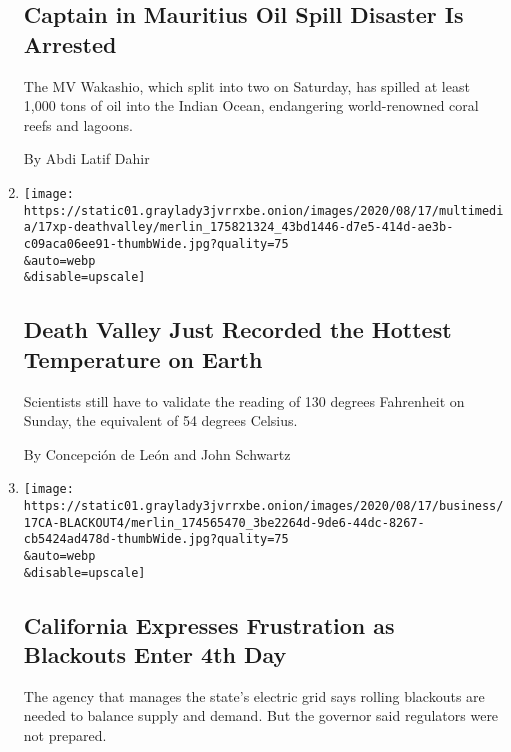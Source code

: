 \begin{enumerate}
  \hypertarget{captain-in-mauritius-oil-spill-disaster-is-arrested}{%
  \subsection{Captain in Mauritius Oil Spill Disaster Is
  Arrested}\label{captain-in-mauritius-oil-spill-disaster-is-arrested}}

  The MV Wakashio, which split into two on Saturday, has spilled at
  least 1,000 tons of oil into the Indian Ocean, endangering
  world-renowned coral reefs and lagoons.

  By Abdi Latif Dahir
\item
  \href{/2020/08/17/climate/death-valley-hottest-temperature-on-earth.html}{}

  \texttt{[image: https://static01.graylady3jvrrxbe.onion/images/2020/08/17/multimedia/17xp-deathvalley/merlin\_175821324\_43bd1446-d7e5-414d-ae3b-c09aca06ee91-thumbWide.jpg?quality=75\\\&auto=webp\\\&disable=upscale]}

  \hypertarget{death-valley-just-recorded-the-hottest-temperature-on-earth}{%
  \subsection{Death Valley Just Recorded the Hottest Temperature on
  Earth}\label{death-valley-just-recorded-the-hottest-temperature-on-earth}}

  Scientists still have to validate the reading of 130 degrees
  Fahrenheit on Sunday, the equivalent of 54 degrees Celsius.

  By Concepción de León and John Schwartz
\item
  \href{/2020/08/17/business/energy-environment/california-blackout-electric-grid.html}{}

  \texttt{[image: https://static01.graylady3jvrrxbe.onion/images/2020/08/17/business/17CA-BLACKOUT4/merlin\_174565470\_3be2264d-9de6-44dc-8267-cb5424ad478d-thumbWide.jpg?quality=75\\\&auto=webp\\\&disable=upscale]}

  \hypertarget{california-expresses-frustration-as-blackouts-enter-4th-day}{%
  \subsection{California Expresses Frustration as Blackouts Enter 4th
  Day}\label{california-expresses-frustration-as-blackouts-enter-4th-day}}

  The agency that manages the state's electric grid says rolling
  blackouts are needed to balance supply and demand. But the governor
  said regulators were not prepared.


\end{enumerate}
